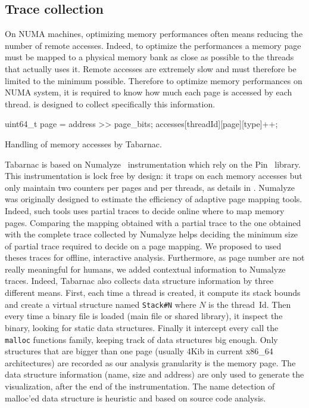 \subsection{Trace collection}

On \gls{NUMA} machines, optimizing memory performances often means reducing the number of remote accesses.
Indeed, to optimize the performances a memory page must be mapped to a physical memory bank as close as possible to the threads that actually uses it.
Remote accesses are extremely slow and must therefore be limited to the minimum possible.
Therefore to optimize memory performances on \gls{NUMA} system, it is required to know how much each page is accessed by each thread.
 is designed to collect specifically this information.

\begin{algorithm}[htb]
    \begin{algorithmic}
            \State uint64\_t page = address >> page\_bits;
            \State accesses[threadId][page][type]++;
        \EndFunction
    \end{algorithmic}
    \caption{Handling of memory accesses by Tabarnac.}
    \label{alg:Tabarnac}
\end{algorithm}

\gls{Tabarnac} is based on Numalyze~\cite{Diener15Characterizing} instrumentation which rely on the \gls{Pin}~\cite{Luk05Pin} library.
This instrumentation is lock free by design: it traps on each memory accesses but only maintain two counters per pages and per threads, as details in .
Numalyze was originally designed to estimate the efficiency of adaptive page mapping tools.
Indeed, such tools uses partial traces to decide online where to map memory pages.
Comparing the mapping obtained with a partial trace to the one obtained with the complete trace collected by Numalyze helps deciding the minimum size of partial trace required to decide on a page mapping.
We proposed to used theses traces for offline, interactive analysis.
Furthermore, as page number are not really meaningful for humans, we added contextual information to Numalyze traces.
Indeed, \gls{Tabarnac} also collects data structure information by three different means.
First, each time a thread is created, it compute its stack bounds and create a virtual structure named \texttt{Stack\#N} where $N$ is the thread~Id.
Then every time a binary file is loaded (main file or shared library), it inspect the binary, looking for static data structures.
Finally it intercept every call the \texttt{malloc} functions family, keeping track of data structures big enough.
Only structures that are bigger than one page (usually $4$Kib in current x86\_64 architectures) are recorded as our analysis granularity is the memory page. The data structure information (name, size and address) are only used to generate the visualization, after the end of the instrumentation.
The name detection of malloc'ed data structure is heuristic and based on source code analysis.

